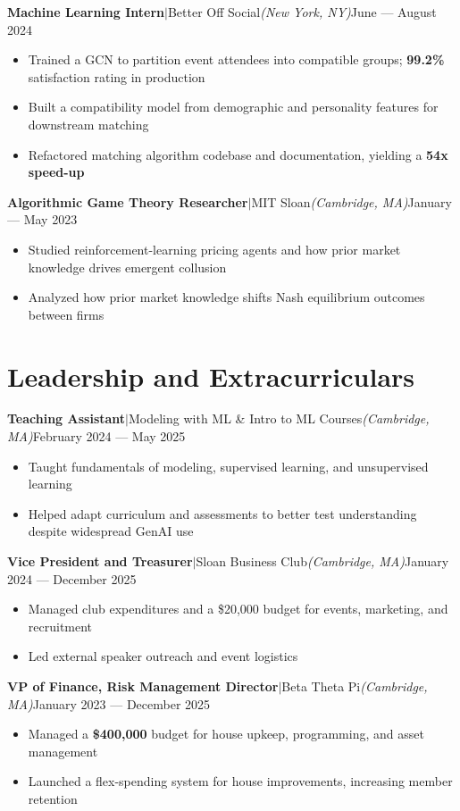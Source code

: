 \documentclass[letterpaper,10pt]{article}
\newcommand{\entry}[4]{%
  \vspace{6pt}%
  \noindent\textbf{#1}\enspace$|$\enspace#2\enspace\textit{(#3)}\hfill#4%
  \vspace{1pt}%
}
\newcommand{\bulletlist}{\begin{itemize}[leftmargin=1.2em, rightmargin=3.7em, labelsep=0.45em, itemsep=0.5pt, topsep=0pt, parsep=0pt, partopsep=0pt]}
\newcommand{\bulletlistend}{\end{itemize}}
\begin{document}
\entry{Machine Learning Intern}{Better Off Social}{New York, NY}{June --- August 2024}
\bulletlist
  \item Trained a GCN to partition event attendees into compatible groups; \textbf{99.2\%} satisfaction rating in production
  \item Built a compatibility model from demographic and personality features for downstream matching
  \item Refactored matching algorithm codebase and documentation, yielding a \textbf{54x speed-up}
\bulletlistend

\entry{Algorithmic Game Theory Researcher}{MIT Sloan}{Cambridge, MA}{January --- May 2023}
\bulletlist
  \item Studied reinforcement-learning pricing agents and how prior market knowledge drives emergent collusion
  \item Analyzed how prior market knowledge shifts Nash equilibrium outcomes between firms
\bulletlistend

\section{Leadership and Extracurriculars}

\entry{Teaching Assistant}{Modeling with ML \& Intro to ML Courses}{Cambridge, MA}{February 2024 --- May 2025}
\bulletlist
  \item Taught fundamentals of modeling, supervised learning, and unsupervised learning
  \item Helped adapt curriculum and assessments to better test understanding despite widespread GenAI use
\bulletlistend

\entry{Vice President and Treasurer}{Sloan Business Club}{Cambridge, MA}{January 2024 --- December 2025}
\bulletlist
  \item Managed club expenditures and a \$20,000 budget for events, marketing, and recruitment
  \item Led external speaker outreach and event logistics
\bulletlistend

\entry{VP of Finance, Risk Management Director}{Beta Theta Pi}{Cambridge, MA}{January 2023 --- December 2025}
\bulletlist
  \item Managed a \textbf{\$400,000} budget for house upkeep, programming, and asset management
  \item Launched a flex-spending system for house improvements, increasing member retention
\bulletlistend
\end{document}
